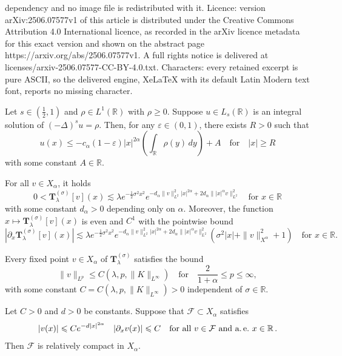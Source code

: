 \documentclass[10pt,a4paper]{amsart}
\newcommand{\Ds}{(-\Delta)^{s}}
\newcommand{\R}{\mathbb{R}}
\newcommand{\Tss}{\mathbf{T}^{(\sigma)}_\lambda}
\newcommand{\eps}{\varepsilon}
\newcommand{\eu}{e}
\newcommand{\pt}{\partial}
\renewcommand{\geq}{\geqslant}
\renewcommand{\leq}{\leqslant}
\begin{document}
dependency and no image file is redistributed with it. Licence: version arXiv:2506.07577v1 of this article is distributed under the Creative Commons Attribution 4.0 International licence, as recorded in the arXiv licence metadata for this exact version and shown on the abstract page https://arxiv.org/abs/2506.07577v1. A full rights notice is delivered at licenses/arxiv-2506.07577-CC-BY-4.0.txt. Characters: every retained excerpt is pure ASCII, so the delivered engine, XeLaTeX with its default Latin Modern text font, reports no missing character.
\begin{lem} \label{lem:decay}
Let $s \in (\frac 1 2, 1)$ and $\rho \in L^1(\R)$ with $\rho \geq 0$. Suppose $u \in L_s(\R)$ is an integral solution of $\Ds u = \rho$. Then, for any $\eps \in (0,1)$, there exists $R > 0$ such that
$$
u(x) \leq -c_\alpha (1-\eps) |x|^{2 \alpha} \left ( \int_\R \rho(y) \, dy \right ) + A \quad \mbox{for} \quad  |x| \geq R
$$
with some constant $A \in \R$.
\end{lem}

\begin{prop} \label{prop:T_bounds}
For all $v \in X_\alpha$, it holds
$$
0 < \Tss[v](x) \lesssim \lambda e^{-\frac{1}{2} \sigma^2 x^2} e^{-d_\alpha \| v \|_{L^2}^2 |x|^{2 \alpha} + 2 d_\alpha \| |x|^{\alpha} v \|_{L^2}^2} \quad \mbox{for $x \in \R$}
$$
with some constant $d_\alpha > 0$ depending only on $\alpha$.  Moreover, the function $x \mapsto \Tss[v](x)$ is even and $C^1$ with the pointwise bound
$$
|\pt_x \Tss[v](x)| \lesssim \lambda e^{-\frac{1}{2} \sigma^2 x^2} e^{-d_\alpha \| v \|_{L^2}^2 |x|^{2 \alpha} + 2 d_\alpha \| |x|^{\alpha} v \|_{L^2}^2} \left ( \sigma^2 |x| + \| v \|_{X^\alpha}^2 + 1 \right ) \quad \mbox{for $x \in \R$}.
$$
\end{prop}

\begin{lem} \label{lem:HLS}
Every fixed point $v \in X_\alpha$ of $\Tss$ satisfies the bound
$$
\| v \|_{L^p} \leq C(\lambda, p, \| K \|_{L^\infty}) \quad \mbox{for} \quad \mbox{$\frac{2}{1+ \alpha} \leq p \leq \infty$},
$$
with some constant $C=C(\lambda,p,\| K \|_{L^\infty}) > 0$ independent of $\sigma \in \R$.
\end{lem}

\begin{lem} \label{lem:compact}
Let $C > 0$ and $d >0$ be constants. Suppose that $\mathcal{F} \subset X_\alpha$ satisfies
$$
|v(x)| \leq C \eu^{-d |x|^{2 \alpha}} \quad |\pt_x v(x)| \leq C \quad \mbox{for all $v \in \mathcal{F}$ and a.\,e.~$x \in \R$} \, .
$$
Then $\mathcal{F}$ is relatively compact in $X_\alpha$. 
\end{lem}
\end{document}
